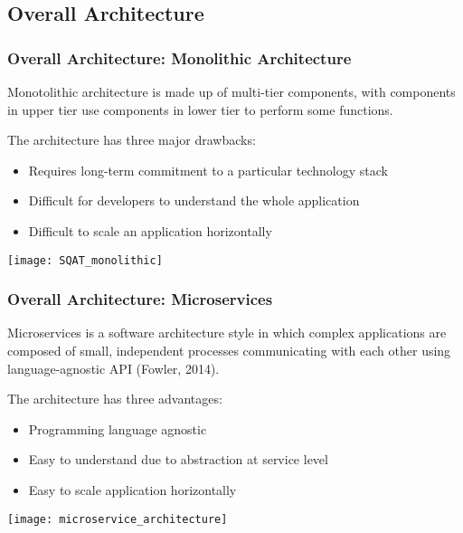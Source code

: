 \subsection{Overall Architecture}
\begin{frame}[allowframebreaks]
\frametitle{Overall Architecture: Monolithic Architecture}

\begin{definition}
Monotolithic architecture is made up of multi-tier components, with components in upper tier use components in lower tier to perform some functions.
\end{definition}

The architecture has three major drawbacks:
\begin{itemize}
  \item Requires long-term commitment to a particular technology stack
  \item Difficult for developers to understand the whole application
  \item Difficult to scale an application horizontally
\end{itemize}

\framebreak

\begin{center}
\texttt{[image: SQAT\_monolithic]}
\end{center}

\end{frame}

\begin{frame}[allowframebreaks]
\frametitle{Overall Architecture: Microservices}

\begin{definition}
Microservices is a software architecture style in which complex applications are composed of small, independent processes communicating with each other using language-agnostic API (Fowler, 2014).
\end{definition}

The architecture has three advantages:
\begin{itemize}
  \item Programming language agnostic
  \item Easy to understand due to abstraction at service level
  \item Easy to scale application horizontally
\end{itemize}

\framebreak

\begin{center}
\texttt{[image: microservice\_architecture]}
\end{center}
\end{frame}
